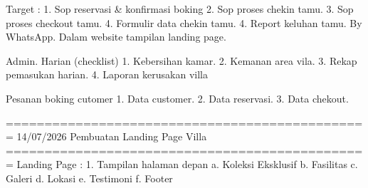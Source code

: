 Target :
1. Sop reservasi & konfirmasi boking
2. Sop proses chekin tamu.
3. Sop proses checkout tamu.
4. Formulir data chekin tamu.
4. Report keluhan tamu. By WhatsApp.
Dalam website tampilan landing page.

Admin.
Harian (checklist)
1. Kebersihan kamar.
2. Kemanan area vila.
3. Rekap pemasukan harian.
4. Laporan kerusakan villa 


Pesanan boking cutomer
1. Data customer.
2. Data reservasi.
3. Data chekout.

===============================================
14/07/2026 Pembuatan Landing Page Villa
===============================================
Landing Page :
1. Tampilan halaman depan
    a. Koleksi Eksklusif
    b. Fasilitas
    c. Galeri
    d. Lokasi
    e. Testimoni
    f. Footer
